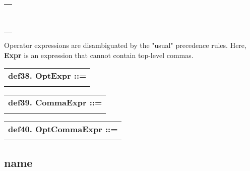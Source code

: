 \documentclass{report}
\begin{document}
\begin{tabular}{l}
\hspace*{3mm}{\tt  $\mid$ "\{" CommaExpr "\}"} \\ 
\hspace*{3mm}{\tt  $\mid$ QuoteExpr} \\ 
\hspace*{3mm}{\tt  $\mid$ TryCatchExpr} \\ 
\hspace*{3mm}{\tt  $\mid$ IfExpr} \\ 
\hspace*{3mm}{\tt  $\mid$ RepeatExpr} \\ 
\hspace*{3mm}{\tt  $\mid$ ForExpr} \\ 
\hspace*{3mm}{\tt  $\mid$ SwitchExpr} \\ 
\hspace*{3mm}{\tt  $\mid$ VarDef} \\ 
\hspace*{3mm}{\tt  $\mid$ ProcedureDef} \\ 
\end{tabular}

Operator expressions are disambiguated by the "usual" precedence
rules. Here, {\bf Expr} is an expression that cannot contain top-level
commas.

\begin{tabular}{l}
{\bf def38. OptExpr ::= }\\ 
\hspace*{3mm}{\tt {[}(Expr){]}} \\ 
\end{tabular}

\begin{tabular}{l}
{\bf def39. CommaExpr ::= }\\ 
\hspace*{3mm}{\tt Expr++ ","} \\ 
\end{tabular}

\begin{tabular}{l}
{\bf def40. OptCommaExpr ::= }\\ 
\hspace*{3mm}{\tt {[}(CommaExpr){]}} \\ 
\end{tabular}

\subsection{name}
\end{document}
